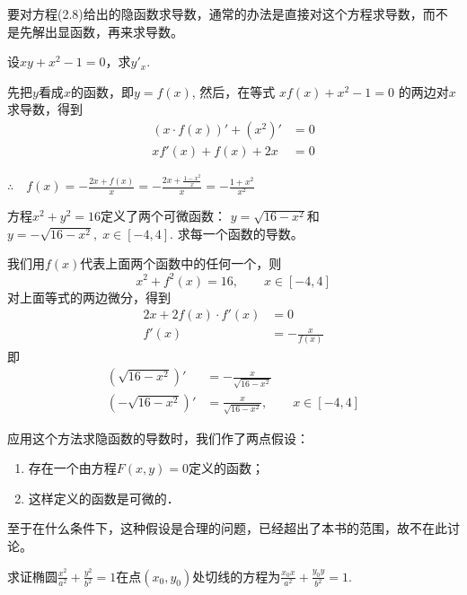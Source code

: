 要对方程(2.8)给出的隐函数求导数，通常的办法是直接对这个方程求导数，而不是先解出显函数，再来求导数。


\begin{example}
设$xy+x^2-1=0$，求$y'_x$.
\end{example}

\begin{solution}
先把$y$看成$x$的函数，即$y=f(x)$, 然后，在等式
$xf (x) +x^2-1=0$
的两边对$x$求导数，得到
\[\begin{split}
    (x\cdot f(x))'+(x^2)'&=0\\
xf'(x)+f(x)+2x&=0
\end{split}\]

$\therefore\quad f (x) =-\frac{2x+f (x)}{x}=-\frac{2x+\frac{1-x^2}{x}}{x}=-\frac{1+x^2}{x^2}$    
\end{solution}

\begin{example}
    方程$x^2+y^2=16$定义了两个可微函数：
$y=\sqrt{16-x^2}$和$y=-\sqrt{16-x^2},\; x\in [-4, 4]$. 求每一个函数的导数。
\end{example}


\begin{solution}
    我们用$f(x)$代表上面两个函数中的任何一个，则
\[x^2+f^2 (x) =16,\qquad  x\in  [-4, 4] \]
对上面等式的两边微分，得到
\[\begin{split}
    2x+2f (x) \cdot f' (x) &=0\\
    f'(x)&=-\frac{x}{f(x)}
\end{split} \]
即
\[\begin{split}
    \left(\sqrt{16-x^2}\right)'&=-\frac{x}{\sqrt{16-x^2}}\\
    \left(-\sqrt{16-x^2}\right)'&=\frac{x}{\sqrt{16-x^2}},\qquad x\in[-4,4]
\end{split}\]
\end{solution}

\begin{rmk}
应用这个方法求隐函数的导数时，我们作了两点假设：
\begin{enumerate}
    \item 存在一个由方程$F(x,y)=0$定义的函数；
    \item 这样定义的函数是可微的．
\end{enumerate} 
至于在什么条件下，这种假设是合理的问题，已经超出了本书的范围，故不在此讨论。
\end{rmk}

\begin{example}
求证椭圆$\frac{x^2}{a^2}+\frac{y^2}{b^2}=1$在点$(x_0,y_0)$处切线的方程为$\frac{x_0x}{a^2}+\frac{y_0y}{b^2}=1$.
\end{example}

